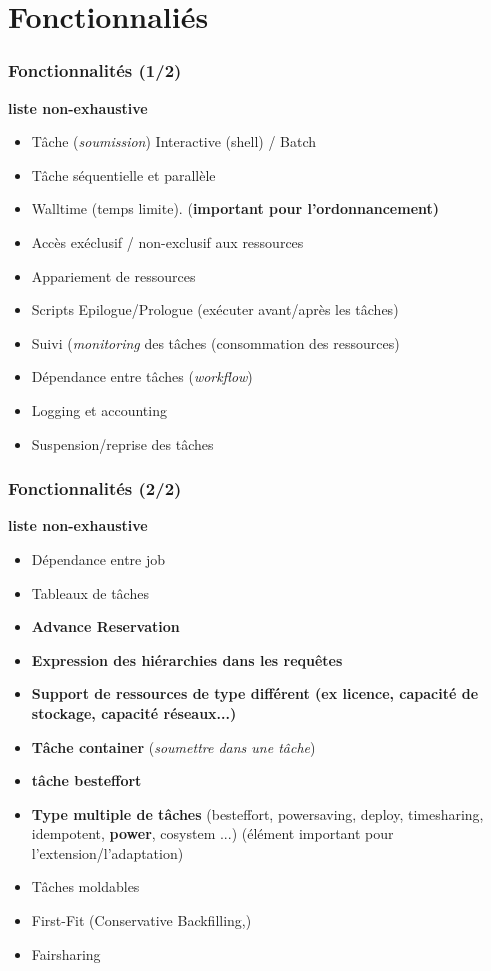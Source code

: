\documentclass{beamer}
\begin{document}
\section{Fonctionnaliés}

\begin{frame}
\frametitle{Fonctionnalités (1/2)}
	{\bf liste non-exhaustive}
		\begin{itemize}
		\item Tâche ({\em soumission}) Interactive (shell) / Batch
		\item Tâche séquentielle et parallèle
		\item Walltime (temps limite). ({\bf important pour l'ordonnancement)}
		\item Accès exéclusif / non-exclusif aux ressources 
		\item Appariement de ressources
		\item Scripts Epilogue/Prologue (exécuter avant/après les tâches)
		\item Suivi ({\em monitoring} des tâches (consommation des ressources)
		\item Dépendance entre tâches ({\em workflow})
		\item Logging et accounting
		\item Suspension/reprise des tâches 
	\end{itemize}
\end{frame}

\begin{frame}
\frametitle{Fonctionnalités (2/2)}
	{\bf liste non-exhaustive}
		\begin{itemize}
    \item Dépendance entre job
    \item Tableaux de tâches
    \item {\bf Advance Reservation }
		\item {\bf Expression des hiérarchies dans les requêtes }
		\item {\bf Support de ressources de type différent (ex licence, capacité de stockage, capacité réseaux...)  }
		\item {\bf Tâche container} ({\em soumettre dans une tâche})
		\item {\bf tâche besteffort}
		\item {\bf Type multiple de tâches} (besteffort, powersaving, deploy, timesharing, idempotent, {\bf power}, cosystem ...) (élément important pour l'extension/l'adaptation)
    \item Tâches moldables
		\item First-Fit (Conservative Backfilling,)
		\item Fairsharing 
		
	\end{itemize}
\end{frame}
\end{document}
